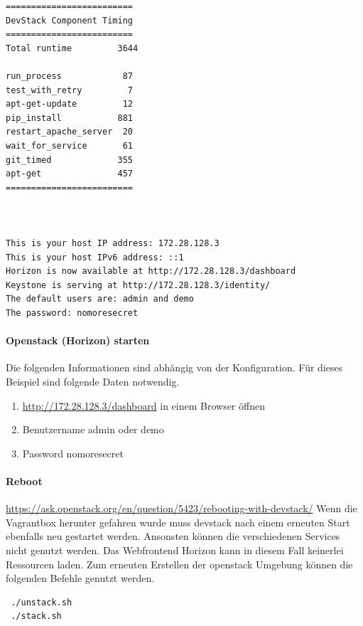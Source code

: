 \documentclass[a4paper,10pt]{article}
\begin{document}
\begin{minipage}{\textwidth}
\begin{lstlisting}
=========================
DevStack Component Timing
=========================
Total runtime         3644

run_process            87
test_with_retry         7
apt-get-update         12
pip_install           881
restart_apache_server  20
wait_for_service       61
git_timed             355
apt-get               457
=========================



This is your host IP address: 172.28.128.3
This is your host IPv6 address: ::1
Horizon is now available at http://172.28.128.3/dashboard
Keystone is serving at http://172.28.128.3/identity/
The default users are: admin and demo
The password: nomoresecret
\end{lstlisting}
\end{minipage}

\paragraph{Openstack (Horizon) starten}

Die folgenden Informationen sind abhängig von der Konfiguration.
Für dieses Beispiel sind folgende Daten notwendig.

\begin{enumerate}
 \item \url{http://172.28.128.3/dashboard} in einem Browser öffnen
 \item Benutzername admin oder demo
 \item Password nomoresecret
\end{enumerate}

\paragraph{Reboot}

\url{https://ask.openstack.org/en/question/5423/rebooting-with-devstack/}
Wenn die Vagrantbox herunter gefahren wurde muss devstack nach einem erneuten Start ebenfalls neu gestartet werden.
Ansonsten können die verschiedenen Services nicht genutzt werden.
Das Webfrontend Horizon kann in diesem Fall keinerlei Ressourcen laden.
Zum erneuten Erstellen der openstack Umgebung können die folgenden Befehle genutzt werden.

\begin{verbatim}
 ./unstack.sh
 ./stack.sh
\end{verbatim}
\end{document}
